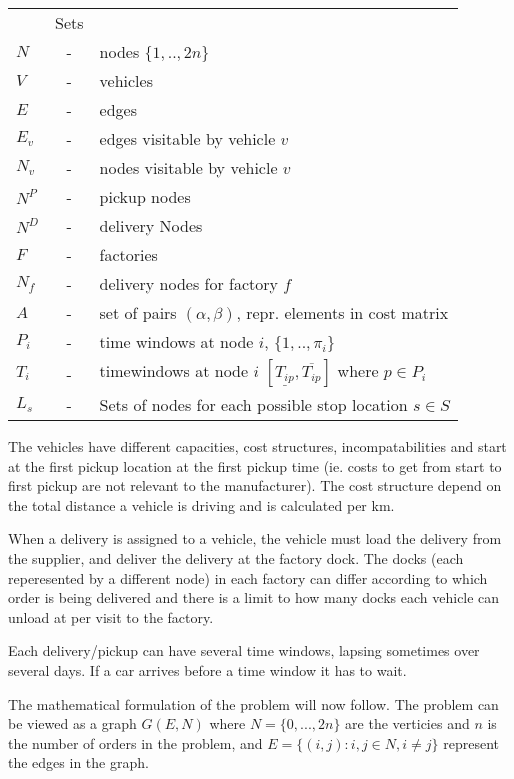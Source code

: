 \documentclass[a4paper,10pt]{article}
\begin{document}
\begin{tabular}{l c l }
          &Sets 						\\ 
    $N    $ &-& nodes $\{1,..,2n\}$ 				\\
    $V    $ &-& vehicles  					\\
    $E    $ &-& edges 						\\
    $E_v  $ &-& edges visitable by vehicle $v$ 			\\
    $N_v  $ &-& nodes visitable by vehicle $v$  		\\
    $N^P  $ &-& pickup nodes 					\\
    $N^D  $ &-& delivery Nodes 					\\
    $F    $ &-& factories 					\\
    $N_f  $ &-& delivery nodes for factory $f$ 			\\
    $A    $ &-& set of pairs $(\alpha, \beta)$, repr. elements in cost matrix	\\
    $P_i  $ &-& time windows at node $i$, $\{1,..,\pi_i \}$	\\
    $T_{i}$ &-& timewindows at node $i$ $[ \underline{T_{ip}},  
		\overline{T_{ip}} ]$ where $p \in P_i$		\\
   $L_s$ &-& Sets of nodes for each possible stop location $s \in S$ 	\\
\end{tabular}
\linebreak
\linebreak
\par

The vehicles have different capacities, cost structures, incompatabilities and start at the first pickup location at the first pickup time (ie. costs to get from start to first pickup are not relevant to the manufacturer).
The cost structure depend on the total distance a vehicle is driving and is calculated per km. \par
When a delivery is assigned to a vehicle, the vehicle must load the delivery from the supplier, and deliver the delivery at the factory dock.
The docks (each reperesented by a different node) in each factory can differ according to which order is being delivered and there is a limit to how many docks each vehicle can unload at per visit to the factory. \par
Each delivery/pickup can have several time windows, lapsing sometimes over several days. If a car arrives before a time window it has to wait. \par
The mathematical formulation of the problem will now follow. 
The problem can be viewed as a graph $G(E,N)$ where $N=\{0,...,2n\}$ are the verticies and $n$ is the number of orders in the problem, and $E=\{(i,j): i,j \in N, i \neq j\}$ represent the edges in the graph.
\linebreak
\end{document}
